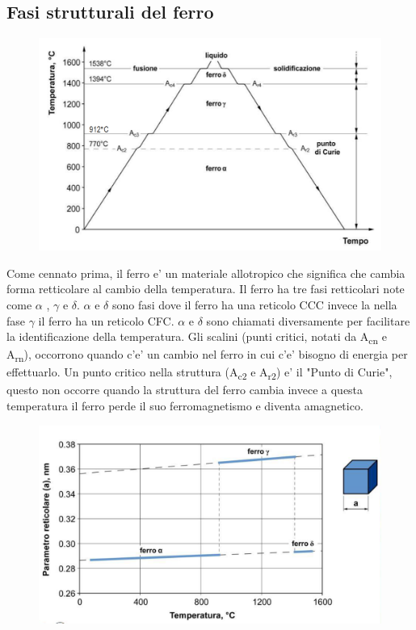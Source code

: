 \documentclass{article}
\begin{document}
        \subsection{Fasi strutturali del ferro}
            \begin{figure}[h!]
                \centering
                \includegraphics[width=.85\linewidth]{Fasi Ferro.png}
                \end{figure}
            Come cennato prima, il ferro e' un materiale allotropico che significa che cambia forma retticolare al cambio della temperatura.
            Il ferro ha tre fasi retticolari note come $\alpha$ , $\gamma$ e $\delta$. $\alpha$ e $\delta$ sono fasi dove il ferro ha una reticolo CCC 
            invece la nella fase $\gamma$ il ferro ha un reticolo CFC. $\alpha$ e $\delta$ sono chiamati diversamente per facilitare la identificazione 
            della temperatura.
            \newline \newline Gli scalini (punti critici, notati da A\textsubscript{cn} e A\textsubscript{rn}), occorrono quando c'e' un cambio nel 
            ferro in cui c'e' bisogno di energia per effettuarlo.
            \newline \newline Un punto critico nella struttura (A\textsubscript{c2} e A\textsubscript{r2}) e' il "Punto di Curie", questo non 
            occorre quando la struttura del ferro cambia invece a questa temperatura il ferro perde il suo ferromagnetismo e diventa amagnetico.
            \begin{figure}[h!]
                \centering
                \includegraphics[width=.85\linewidth]{Cambio parametro reticolare nel ferro.png}
            \end{figure} 
\end{document}
